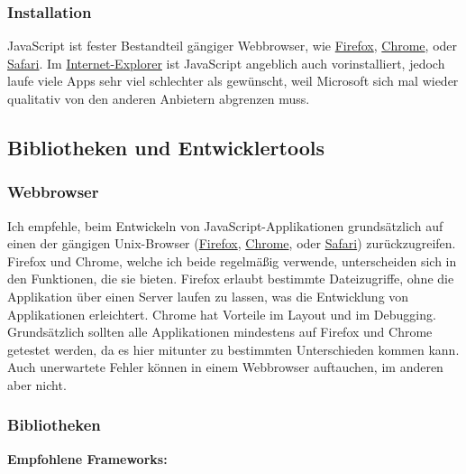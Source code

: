 \subsubsection{\texorpdfstring{{Installation}}{Installation}}

{ JavaScript ist fester Bestandteil gängiger Webbrowser, wie
\href{http://de.wikipedia.org/wiki/Mozilla_Firefox}{Firefox},
\href{http://de.wikipedia.org/wiki/Google_Chrome}{Chrome}, oder
\href{http://de.wikipedia.org/wiki/Apple_Safari}{Safari}. Im
\href{http://de.wikipedia.org/wiki/Internet_Explorer}{Internet-Explorer}
ist JavaScript angeblich auch vorinstalliert, jedoch laufe viele Apps
sehr viel schlechter als gewünscht, weil Microsoft sich mal wieder
qualitativ von den anderen Anbietern abgrenzen muss. }

\subsection{\texorpdfstring{{Bibliotheken und
Entwicklertools}}{Bibliotheken und Entwicklertools}}

\subsubsection{\texorpdfstring{{Webbrowser}}{Webbrowser}}

{ Ich empfehle, beim Entwickeln von JavaScript-Applikationen
grundsätzlich auf einen der gängigen Unix-Browser
(\href{http://de.wikipedia.org/wiki/Mozilla_Firefox}{Firefox},
\href{http://de.wikipedia.org/wiki/Google_Chrome}{Chrome}, oder
\href{http://de.wikipedia.org/wiki/Apple_Safari}{Safari})
zurückzugreifen. Firefox und Chrome, welche ich beide regelmäßig
verwende, unterscheiden sich in den Funktionen, die sie bieten. Firefox
erlaubt bestimmte Dateizugriffe, ohne die Applikation über einen Server
laufen zu lassen, was die Entwicklung von Applikationen erleichtert.
Chrome hat Vorteile im Layout und im Debugging. Grundsätzlich sollten
alle Applikationen mindestens auf Firefox und Chrome getestet werden, da
es hier mitunter zu bestimmten Unterschieden kommen kann. Auch
unerwartete Fehler können in einem Webbrowser auftauchen, im anderen
aber nicht. }


\subsubsection{\texorpdfstring{{Bibliotheken}}{Bibliotheken}}

\par\noindent\textbf{Empfohlene Frameworks:}

